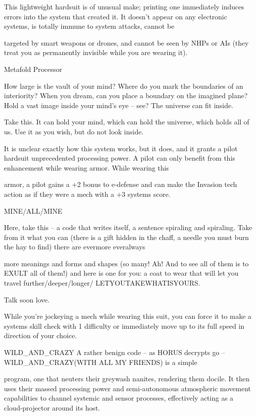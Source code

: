 This lightweight hardsuit is of unusual make; printing one immediately induces errors into the system that
created it. It doesn’t appear on any electronic systems, is totally immune to system attacks, cannot be

targeted by smart weapons or drones, and cannot be seen by NHPs or AIs (they treat you as permanently
invisible while you are wearing it).


Metafold Processor




How large is the vault of your mind? Where do you mark the boundaries of an interiority? When you dream,
can you place a boundary on the imagined plane? Hold a vast image inside your mind’s eye -- see? The
universe can fit inside.

Take this. It can hold your mind, which can hold the universe, which holds all of us. Use it as you wish, but
do not look inside.

It is unclear exactly how this system works, but it does, and it grants a pilot hardsuit unprecedented
processing power. A pilot can only benefit from this enhancement while wearing armor. While wearing this

armor, a pilot gains a +2 bonus to e-defense and can make the Invasion tech action as if they were a mech
with a +3 systems score.


MINE/ALL/MINE

Here, take this -- a code that writes itself, a sentence spiraling and spiraling. Take from it what you can
(there is a gift hidden in the chaff, a needle you must burn the hay to find) there are evermore everalways

more meanings and forms and shapes (so many! Ah! And to see all of them is to EXULT all of them!) and
here is one for you: a coat to wear that will let you travel further/deeper/longer/
LETYOUTAKEWHATISYOURS.

Talk soon love.

While you’re jockeying a mech while wearing this suit, you can force it to make a systems skill check with
1 difficulty or immediately move up to its full speed in direction of your choice.


WILD\_AND\_CRAZY
A rather benign code -- as HORUS decrypts go -- WILD\_AND\_CRAZY(WITH ALL MY FRIENDS) is a simple

program, one that neuters their greywash nanites, rendering them docile. It then uses their massed
processing power and semi-autonomous atmospheric movement capabilities to channel systemic and
sensor processes, effectively acting as a cloud-projector around its host.

